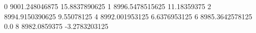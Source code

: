 0 9001.248046875 15.8837890625
1 8996.5478515625 11.18359375
2 8994.9150390625 9.55078125
4 8992.001953125 6.6376953125
6 8985.3642578125 0.0
8 8982.0859375 -3.2783203125
